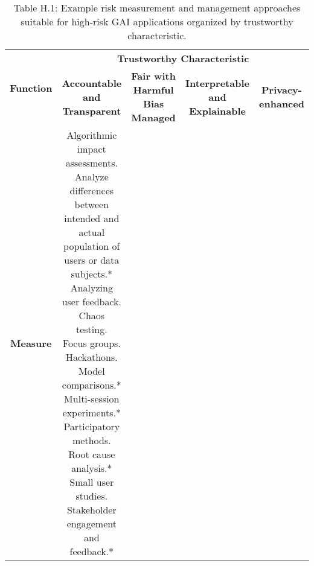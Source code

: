 \documentclass[fleqn]{article}
\begin{document}
\begin{landscape}
\begin{table}[H]
	\caption*{Table H.1: Example risk measurement and management approaches suitable for high-risk GAI applications organized by trustworthy characteristic.}
	\footnotesize
	\begin{tabular}{|c|c|c|c|c|}
		\hline
		\multirow{2}{*}{\textbf{Function}} & \multicolumn{4}{|c|}{\textbf{Trustworthy Characteristic}}   \\
		\cline{2-5}
		& \textbf{Accountable and Transparent} & \textbf{Fair with Harmful Bias Managed} & \textbf{Interpretable and Explainable} & \textbf{Privacy-enhanced} \\
		\hline
		\textbf{Measure} & 
		\makecell[l]{
			\textbullet\hspace{3pt} Algorithmic impact assessments. \\
			\textbullet\hspace{3pt} Analyze differences between \\\hspace{10pt}intended and actual population of \\\hspace{10pt}users or data subjects.*\\
			\textbullet\hspace{3pt} Analyzing user feedback. \\
			\textbullet\hspace{3pt} Chaos testing. \\
			\textbullet\hspace{3pt} Focus groups. \\
			\textbullet\hspace{3pt} Hackathons. \\
			\textbullet\hspace{3pt} Model comparisons.* \\
			\textbullet\hspace{3pt} Multi-session experiments.* \\
			\textbullet\hspace{3pt} Participatory methods. \\			
			\textbullet\hspace{3pt} Root cause analysis.* \\			
			\textbullet\hspace{3pt} Small user studies. \\			
			\textbullet\hspace{3pt} Stakeholder engagement and \\\hspace{10pt}feedback.* \\			
}
\end{tabular}
\end{table}
\end{landscape}
\end{document}
